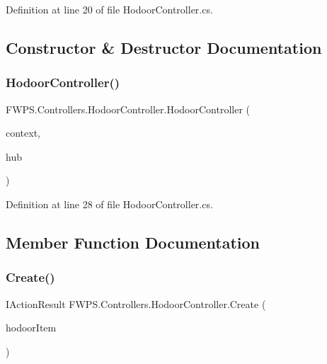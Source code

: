 Definition at line 20 of file Hodoor\+Controller.\+cs.



\subsection{Constructor \& Destructor Documentation}
\mbox{\label{class_f_w_p_s_1_1_controllers_1_1_hodoor_controller_adce9f31ecaab1ed1e08cb9cf09c305f2}} 
\subsubsection{\texorpdfstring{Hodoor\+Controller()}{HodoorController()}}
{\footnotesize\ttfamily F\+W\+P\+S.\+Controllers.\+Hodoor\+Controller.\+Hodoor\+Controller (\begin{DoxyParamCaption}\item[{\mbox{\hyperlink{class_f_w_p_s_1_1_data_1_1_fwps_db_context}{Fwps\+Db\+Context}}}]{context,  }\item[{I\+Hub\+Context$<$ \mbox{\hyperlink{class_f_w_p_s_1_1_devices_hub}{Devices\+Hub}} $>$}]{hub }\end{DoxyParamCaption})}



Definition at line 28 of file Hodoor\+Controller.\+cs.



\subsection{Member Function Documentation}
\mbox{\label{class_f_w_p_s_1_1_controllers_1_1_hodoor_controller_a10c4a8b451c2ed13e161beca8341e5dc}} 
\subsubsection{\texorpdfstring{Create()}{Create()}}
{\footnotesize\ttfamily I\+Action\+Result F\+W\+P\+S.\+Controllers.\+Hodoor\+Controller.\+Create (\begin{DoxyParamCaption}\item[{\mbox{[}\+From\+Body\mbox{]} \mbox{\hyperlink{class_f_w_p_s_1_1_models_1_1_hodoor_item}{Hodoor\+Item}}}]{hodoor\+Item }\end{DoxyParamCaption})}



